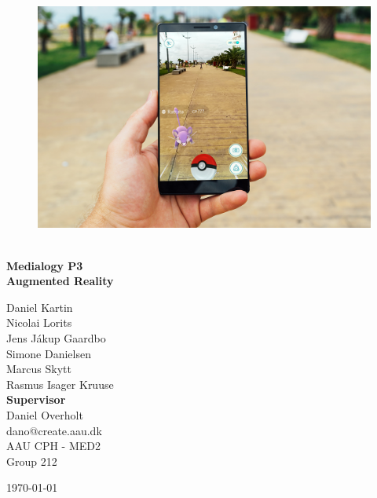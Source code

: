 \begin{titlepage}
			
\addtolength{\voffset}{2cm}

\begin{figure}[H]
\centering
\vspace{2cm}	%
\includegraphics[width=0.99\linewidth]{figure/Frontpage/frontpage_bg.jpg}
\end{figure}

\mbox{}
\vfill
\renewcommand{\familydefault}{\sfdefault} \normalfont %
\HRule\\[0.2cm]
\textbf{{\small Medialogy P3\\ \Huge Augmented Reality}}\\
\HRule\medskip{}
\begin{multicols}{2}
{\Large Daniel Kartin\vspace{0.3mm}\\Nicolai Lorits\\Jens Jákup Gaardbo\\Simone Danielsen\\Marcus Skytt\\Rasmus Isager Kruuse\columnbreak}\\
\setlength{\parskip}{2.4cm}
\Large{\textbf{Supervisor}\\Daniel Overholt\\dano@create.aau.dk}
\\\small AAU CPH - 
MED2 \\
Group 212\\
\end{multicols}
\today
\renewcommand{\familydefault}{\rmdefault} \normalfont %
\end{titlepage}



